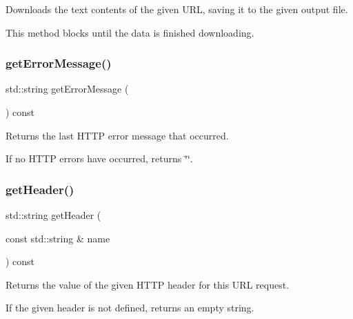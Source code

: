 Downloads the text contents of the given U\+RL, saving it to the given output file. 

This method blocks until the data is finished downloading. \mbox{\label{classsgl_1_1GDownloader_adf0cc934eff26878cdf2018259997a4a}} 
\subsubsection{\texorpdfstring{get\+Error\+Message()}{getErrorMessage()}}
{\footnotesize\ttfamily std\+::string get\+Error\+Message (\begin{DoxyParamCaption}{ }\end{DoxyParamCaption}) const}



Returns the last H\+T\+TP error message that occurred. 

If no H\+T\+TP errors have occurred, returns \char`\"{}\char`\"{}. \mbox{\label{classsgl_1_1GDownloader_a736d777b29179f52ba753317d84b1087}} 
\subsubsection{\texorpdfstring{get\+Header()}{getHeader()}}
{\footnotesize\ttfamily std\+::string get\+Header (\begin{DoxyParamCaption}\item[{const std\+::string \&}]{name }\end{DoxyParamCaption}) const}



Returns the value of the given H\+T\+TP header for this U\+RL request. 

If the given header is not defined, returns an empty string. \mbox{\label{classsgl_1_1GDownloader_ab6c069ef77f1319830dcfd90eed6a2ce}} 
